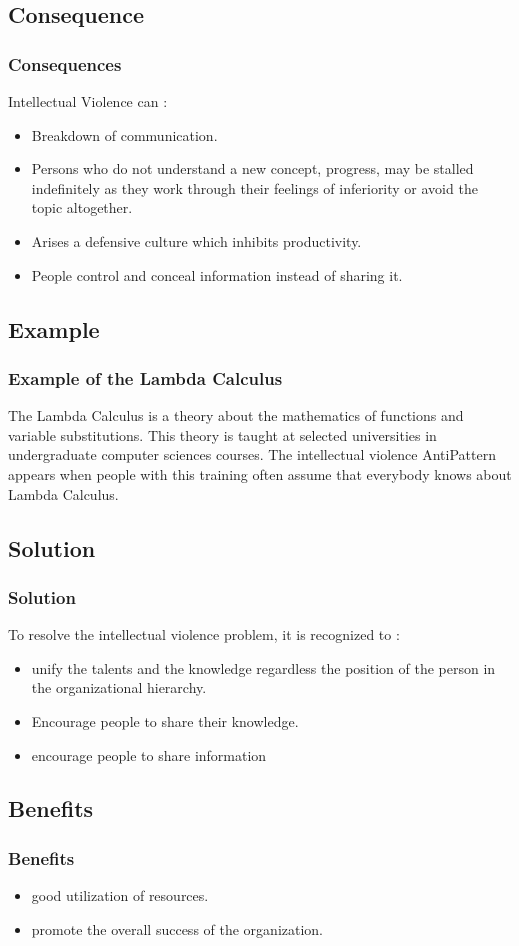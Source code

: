 \documentclass{beamer}
\begin{document}
\subsection{Consequence}
\begin{frame}
\frametitle{Consequences}
Intellectual Violence can :\\
\begin{itemize}
\item  Breakdown of communication.
\item  Persons who do not understand a new concept, progress, may be stalled indefinitely as they work through their feelings of inferiority or avoid the topic altogether.
\item Arises a defensive culture  which inhibits productivity.
\item People control and conceal information instead of sharing it.
\end{itemize}
\end{frame}

\subsection{Example}
\begin{frame}
\frametitle{Example of the Lambda Calculus}
The Lambda Calculus is a theory about the mathematics of functions and variable substitutions. This theory is taught at selected universities in undergraduate computer sciences courses. The intellectual violence AntiPattern  appears when people with this training often assume that everybody knows about Lambda Calculus.
\end{frame}

\subsection{Solution}
\begin{frame}
\frametitle{Solution}
To resolve the intellectual violence problem, it is recognized to :
\begin{itemize}
\item unify the talents and the knowledge regardless the position of the person in the organizational hierarchy.
\item  Encourage people to share their knowledge.
\item encourage people to share information
\end{itemize}
\end{frame}

\subsection{Benefits}
\begin{frame}
\frametitle{Benefits}
\begin{itemize}
\item good utilization of resources.
\item promote the overall success of the organization.
\end{itemize}
\end{frame}
\end{document}

